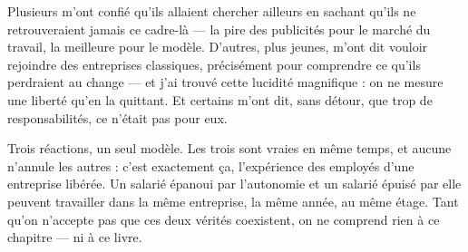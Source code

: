 Plusieurs m'ont confié qu'ils allaient chercher ailleurs en sachant qu'ils ne retrouveraient jamais ce cadre-là — la pire des publicités pour le marché du travail, la meilleure pour le modèle. D'autres, plus jeunes, m'ont dit vouloir rejoindre des entreprises classiques, précisément pour comprendre ce qu'ils perdraient au change — et j'ai trouvé cette lucidité magnifique : on ne mesure une liberté qu'en la quittant. Et certains m'ont dit, sans détour, que trop de responsabilités, ce n'était pas pour eux.

Trois réactions, un seul modèle. Les trois sont vraies en même temps, et aucune n'annule les autres : c'est exactement ça, l'expérience des employés d'une entreprise libérée. Un salarié épanoui par l'autonomie et un salarié épuisé par elle peuvent travailler dans la même entreprise, la même année, au même étage. Tant qu'on n'accepte pas que ces deux vérités coexistent, on ne comprend rien à ce chapitre — ni à ce livre.
